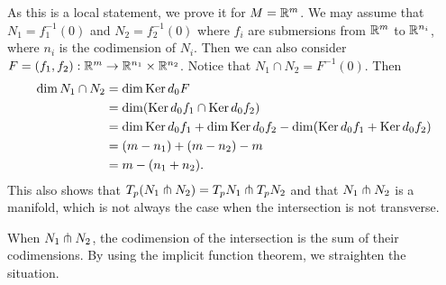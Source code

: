 \begin{myproof}
    As this is a local statement, we prove it for $M = \mathbb{R}^{m}$.
    We may assume that $N_1 = f_1^{-1}(0)$ and $ N_2 = f_2^{-1}(0)$ where $f_i$ are submersions from $\mathbb{R}^{m}$ to $\mathbb{R}^{n_i}$, where $n_i$ is the codimension of $N_i$.
    Then we can also consider $F= (f_1, f_2): \mathbb{R}^{m} \to  \mathbb{R}^{n_1} \times \mathbb{R}^{n_2}$.
    Notice that $ N_1 \cap N_2 = F^{-1}(0)$.
    Then
    \begin{align*}
        \dim N_1 \cap  N_2 &= \dim \operatorname{Ker} d_0F\\
                           &= \dim(\operatorname{Ker} d_0 f_1 \cap \operatorname{Ker} d_0 f_2)\\
                           &= \dim \operatorname{Ker} d_0 f_1 + \dim \operatorname{Ker} d_0 f_2 - \dim (\operatorname{Ker} d_0 f_1 + \operatorname{Ker} d_0 f_2)\\
                           &= (m - n_1) + (m - n_2) - m\\
                           &= m - (n_1 + n_2)
    .\end{align*} 
    This also shows that $T_p(N_1 \pitchfork N_2) = T_pN_1 \pitchfork T_pN_2$ and that $ N_1 \pitchfork N_2$ is a manifold, which is not always the case when the intersection is not transverse.
\end{myproof}
\begin{marginfigure}[-5cm]
    \centering
    \caption{When $N_1 \pitchfork N_2$, the codimension of the intersection is the sum of their codimensions. By using the implicit function theorem, we straighten the situation.}
    \label{fig:codimensions-transverse}
\end{marginfigure}

